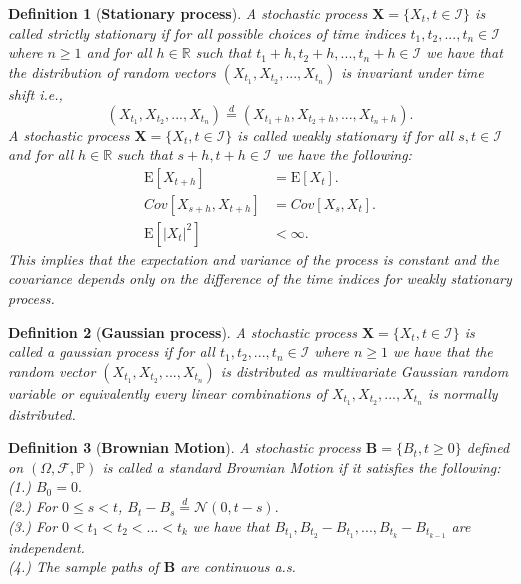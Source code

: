 \documentclass[12pt]{report}
\newtheorem{definition}{Definition}[section]
\newcommand{\E}{\mathrm{E}}
\begin{document}
\begin{definition}[\textbf{Stationary process}] 
A stochastic process $\mathbf{X} = \{X_t ,t \in \mathcal{I}\}$ is called strictly stationary if for all possible choices of time indices $t_1,t_2,...,t_n \in \mathcal{I}$ where $n \geq 1$ and for all $h \in \mathbb{R}$ such that $t_1+h,t_2+h,...,t_n+h \in \mathcal{I}$ we have that the distribution of random vectors $(X_{t_1},X_{t_2},...,X_{t_n})$ is invariant under time shift i.e., 
\begin{equation}
   (X_{t_1},X_{t_2},...,X_{t_n}) \stackrel{d}{=} (X_{t_1+h},X_{t_2+h},...,X_{t_n+h}). 
\end{equation}
A stochastic process $\mathbf{X} = \{X_t ,t \in \mathcal{I}\}$ is called weakly stationary if for all $s,t \in \mathcal{I}$ and for all $h \in \mathbb{R}$ such that $s+h,t+h \in \mathcal{I}$ we have the following:\\
\begin{equation}
\begin{aligned}
\E[X_{t+h}] & = \E[X_{t}].\\
Cov[X_{s+h},X_{t+h}] & = Cov[X_{s},X_{t}].\\
\E[|X_t|^{2}] &<\infty. 
\end{aligned}
\end{equation}
This implies that the expectation and variance of the process is constant and the covariance depends only on the difference of the time indices for weakly stationary process.
\end{definition}
\begin{definition}[\textbf{Gaussian process}]
A stochastic process $\mathbf{X} = \{X_t ,t \in \mathcal{I}\}$ is called a gaussian process if for all $t_1,t_2,...,t_n \in \mathcal{I}$ where $n \geq 1$ we have that the random vector
$(X_{t_1},X_{t_2},...,X_{t_n})$ is distributed as  multivariate Gaussian random variable or equivalently every linear combinations of $X_{t_1},X_{t_2},...,X_{t_n}$ is normally distributed. 
\end{definition}
\begin{definition}[\textbf{Brownian Motion}]
A stochastic process $\mathbf{B} = \{B_t ,t \geq 0\}$ defined on  $(\Omega,\mathcal{F},\mathbb{P})$ is called a standard Brownian Motion if it satisfies the following:\\
(1.) $B_0=0.$\\
(2.) For $0 \leq s < t$, $ B_{t} - B_s \stackrel{d}{=} \mathcal{N}(0,t-s).$\\
(3.) For $0<t_1<t_2<...<t_k$ we have that $B_{t_{1}},B_{t_{2}}-B_{t_{1}},...,B_{t_{k}}-B_{t_{k-1}}$ are independent.\\
(4.) The sample paths of 
$\mathbf{B}$ are continuous a.s.
\end{definition}
\end{document}
